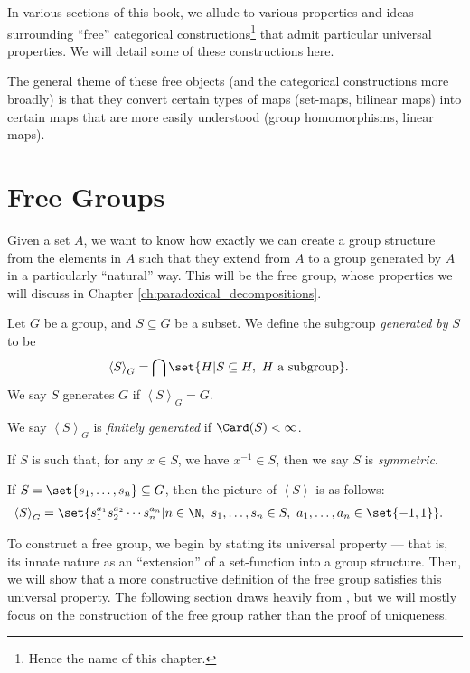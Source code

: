 In various sections of this book, we allude to various properties and ideas surrounding ``free'' categorical constructions\footnote{Hence the name of this chapter.} that admit particular universal properties. We will detail some of these constructions here.\newline

The general theme of these free objects (and the categorical constructions more broadly) is that they convert certain types of maps (set-maps, bilinear maps) into certain maps that are more easily understood (group homomorphisms, linear maps).
\section{Free Groups}%
Given a set $A$, we want to know how exactly we can create a group structure from the elements in $A$ such that they extend from $A$ to a group generated by $A$ in a particularly ``natural'' way. This will be the free group, whose properties we will discuss in Chapter \ref{ch:paradoxical_decompositions}.
\begin{definition}\label{def:generating_sets}
  Let $G$ be a group, and $S\subseteq G$ be a subset. We define the subgroup \textit{generated by} $S$ to be
  \begin{align*}
    \left\langle S \right\rangle_{G} &= \bigcap \set{H | S\subseteq H,~H\text{ a subgroup}}.
  \end{align*}
  We say $S$ generates $G$ if $\left\langle S \right\rangle_{G} = G$.\newline

  We say $\left\langle S \right\rangle_{G}$ is \textit{finitely generated} if $\Card(S) < \infty$.\newline

  If $S$ is such that, for any $x\in S$, we have $x^{-1}\in S$, then we say $S$ is \textit{symmetric}.
\end{definition}
\begin{fact}
  If $S = \set{s_1,\dots,s_n}\subseteq G$, then the picture of $\left\langle S \right\rangle$ is as follows:
  \begin{align*}
    \left\langle S \right\rangle_{G} &= \set{s_1^{a_1}s_2^{a_2}\cdots s_n^{a_n} | n\in\N,~s_1,\dots,s_n\in S,~a_1,\dots,a_n\in \set{-1,1}}.
  \end{align*}
\end{fact}
To construct a free group, we begin by stating its universal property --- that is, its innate nature as an ``extension'' of a set-function into a group structure. Then, we will show that a more constructive definition of the free group satisfies this universal property. The following section draws heavily from \cite{loh_geometric_group_theory}, but we will mostly focus on the construction of the free group rather than the proof of uniqueness.
